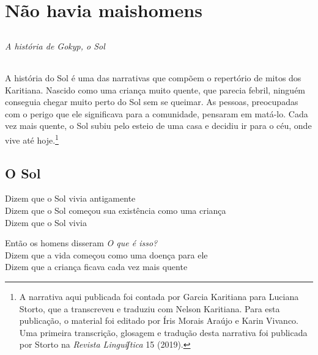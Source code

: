 \part[Não havia mais homens]{Não havia mais\break homens}

\chapter*{}
\thispagestyle{empty}

\vspace*{\fill}
\paragraph{A história de Gokyp, o Sol} A história do Sol é uma das narrativas que compõem o repertório de mitos dos Karitiana. Nascido como uma criança muito quente, que parecia febril, ninguém conseguia chegar muito perto do Sol sem se queimar. As
pessoas, preocupadas com o perigo que ele significava para a comunidade,
pensaram em matá-lo. Cada vez mais quente, o Sol subiu pelo esteio de
uma casa e decidiu ir para o céu, onde vive até hoje.\footnote{A narrativa aqui publicada foi contada por Garcia Karitiana para Luciana Storto, que a transcreveu e traduziu com Nelson Karitiana. Para esta
publicação, o material foi editado por Íris Morais Araújo e Karin
Vivanco. Uma primeira transcrição, glosagem e tradução desta narrativa foi publicada por Storto na \textit{Revista Linguíʃtica} 15 (2019).}
\vspace*{\fill}

\chapter{O Sol}

\noindent Dizem que o Sol vivia antigamente\\
Dizem que o Sol começou sua existência como uma criança\\
Dizem que o Sol vivia

\smallskip
\begin{center}\end{center}
\smallskip

\noindent Então os homens disseram \textit{O que é isso?}\\
Dizem que a vida começou como uma doença para ele\\
Dizem que a criança ficava cada vez mais quente


